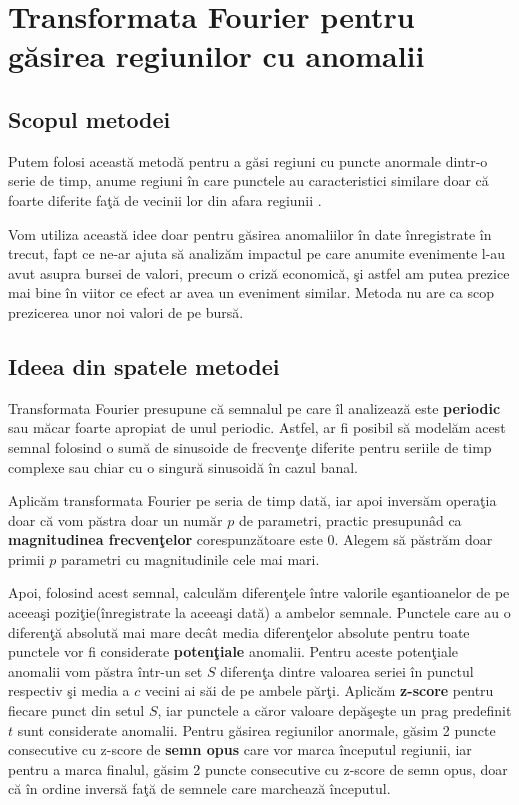 \chapter{Transformata Fourier pentru găsirea regiunilor cu anomalii}

\section{Scopul metodei}

Putem folosi această metodă pentru a găsi regiuni cu puncte anormale dintr-o serie de timp, anume regiuni în care punctele 
au caracteristici similare doar că foarte diferite faţă de vecinii lor din afara regiunii \cite{10.5555/1789574.1789615}.


Vom utiliza această idee doar pentru găsirea anomaliilor în date înregistrate în trecut, fapt ce ne-ar ajuta să analizăm 
impactul pe care anumite evenimente l-au avut asupra bursei de valori, precum o criză economică, şi astfel am putea prezice 
mai bine în viitor ce efect ar avea un eveniment similar. Metoda nu are ca scop prezicerea unor noi valori 
de pe bursă.

\section{Ideea din spatele metodei}

Transformata Fourier presupune că semnalul pe care îl analizează este \textbf{periodic} sau măcar foarte apropiat 
de unul periodic. Astfel, ar fi posibil să modelăm acest semnal folosind o sumă de sinusoide de frecvenţe diferite 
pentru seriile de timp complexe sau chiar cu o singură sinusoidă în cazul banal.

Aplicăm transformata Fourier pe seria de timp dată, iar apoi inversăm operaţia doar că vom păstra doar un număr $p$
de parametri, practic presupunâd ca \textbf{magnitudinea frecvenţelor} corespunzătoare este 0. Alegem să păstrăm doar primii 
$p$ parametri cu magnitudinile cele mai mari.

Apoi, folosind acest semnal, calculăm diferenţele între valorile eşantioanelor de pe aceeaşi poziţie(înregistrate la aceeaşi dată)
a ambelor semnale. Punctele care au o diferenţă absolută mai mare decât media diferenţelor absolute pentru toate punctele vor fi considerate
\textbf{potenţiale} anomalii. Pentru aceste potenţiale anomalii vom păstra într-un set $S$ diferenţa dintre valoarea seriei în punctul respectiv 
şi media a $c$ vecini ai săi de pe ambele părţi. Aplicăm \textbf{z-score} pentru fiecare punct din setul $S$, iar punctele a căror valoare 
depăşeşte un prag predefinit $t$ sunt considerate anomalii. Pentru găsirea regiunilor anormale, găsim 2 puncte consecutive cu z-score 
de \textbf{semn opus} care vor marca începutul regiunii, iar pentru a marca finalul, găsim 2 puncte consecutive cu z-score de semn opus, doar 
că în ordine inversă faţă de semnele care marchează începutul.

